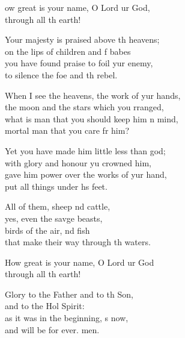 \settowidth{\versewidth}{When I see the heavens, the work of your hands, *}
\begin{psalmverse}%
  \begin{patverse}

ow great is your name, O Lord ur God,\Med\\
through all th earth!

Your majesty is praised above th heavens;\Med\\
on the lips of children and f babes\\
you have found praise to foil yur enemy,\Med\\
to silence the foe and th rebel.

When I see the heavens, the work of yur hands,\Med\\
the moon and the stars which you rranged,\\
what is man that you should keep him \pointup{\i}n mind,\Med\\
mortal man that you care fr him?

Yet you have made him little less than  god;\Med\\
with glory and honour yu crowned him,\\
gave him power over the works of yur hand,\Med\\
put all things under h\pointup{\i}s feet.

All of them, sheep nd cattle,\Med\\
yes, even the savge beasts,\\
birds of the air, nd fish\Med\\
that make their way through th waters.

How great is your name, O Lord ur God\Med\\
through all th earth!

Glory to the Father and to th Son,\Med\\
and to the Hol Spirit:\\
as it was in the beginning, \pointup{\i}s now,\Med\\
and will be for ever. men.
  \end{patverse}
  \end{psalmverse}
